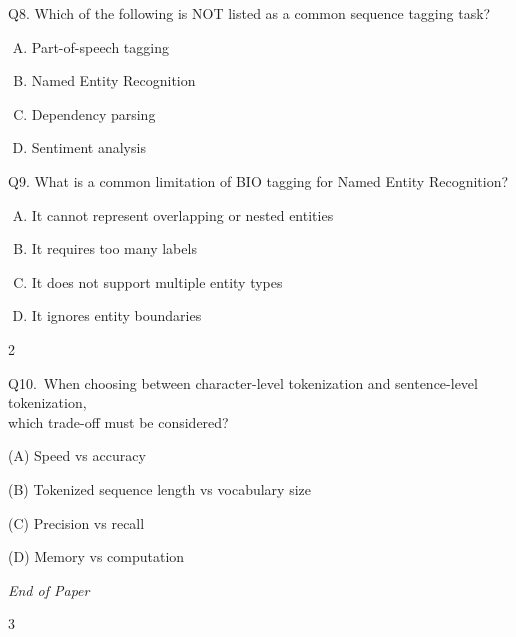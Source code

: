 \documentclass[11pt]{article}
\begin{document}
Q8. Which of the following is NOT listed as a common sequence tagging task?

\begin{enumerate}[(A)]
\item Part-of-speech tagging
\item Named Entity Recognition
\item Dependency parsing
\item Sentiment analysis
\end{enumerate}

Q9. What is a common limitation of BIO tagging for Named Entity Recognition?

\begin{enumerate}[(A)]
\item It cannot represent overlapping or nested entities
\item It requires too many labels
\item It does not support multiple entity types
\item It ignores entity boundaries
\end{enumerate}

\begin{center}
2
\end{center}

\clearpage

Q10.\ When choosing between character-level tokenization and sentence-level tokenization,\\
which trade-off must be considered?

\medskip

\hspace*{2em}(A) Speed vs accuracy

\hspace*{2em}(B) Tokenized sequence length vs vocabulary size

\hspace*{2em}(C) Precision vs recall

\hspace*{2em}(D) Memory vs computation

\vfill

\textit{End of Paper}

\begin{center}
3
\end{center}
\end{document}
